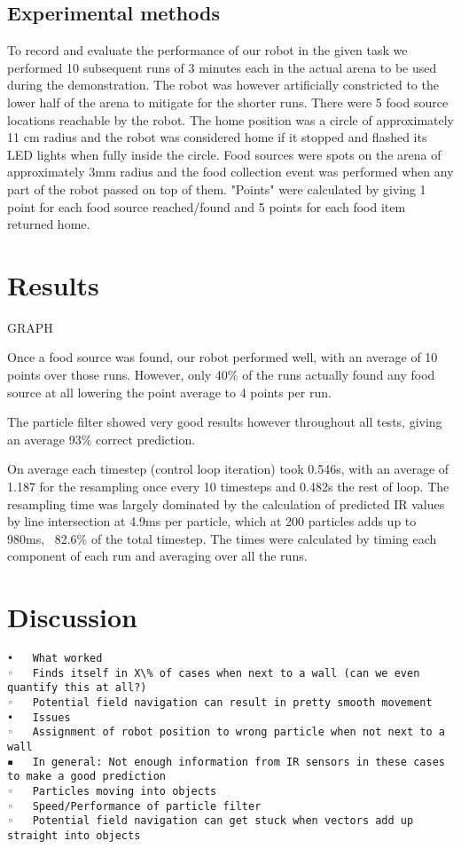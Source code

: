 \documentclass[paper=a4, fontsize=12pt]{scrartcl}	%
\numberwithin{equation}{section}		%
\numberwithin{figure}{section}			%
\numberwithin{table}{section}				%
\begin{document}
\subsection{Experimental methods}
To record and evaluate the performance of our robot in the given task we performed 10 subsequent runs of 3 minutes each in the actual arena to be used during the demonstration. The robot was however artificially constricted to the lower half of the arena to mitigate for the shorter runs. There were 5 food source locations reachable by the robot. The home position was a circle of approximately 11 cm radius and the robot was considered home if it stopped and flashed its LED lights when fully inside the circle. Food sources were spots on the arena of approximately 3mm radius and the food collection event was performed when any part of the robot passed on top of them. "Points" were calculated by giving 1 point for each food source reached/found and 5 points for each food item returned home.
\section{Results}
GRAPH

Once a food source was found, our robot performed well, with an average of 10 points over those runs. However, only 40\% of the runs actually found any food source at all lowering the point average to 4 points per run.

The particle filter showed very good results however throughout all tests, giving an average 93\% correct prediction.

On average each timestep (control loop iteration) took 0.546s, with an average of 1.187 for the resampling once every 10 timesteps and 0.482s the rest of loop. The resampling time was largely dominated by the calculation of predicted IR values by line intersection at 4.9ms per particle, which at 200 particles adds up to 980ms, ~82.6\% of the total timestep. The times were calculated by timing each component of each run and averaging over all the runs.
\section{Discussion}

\begin{verbatim}
•	What worked
◦	Finds itself in X\% of cases when next to a wall (can we even quantify this at all?)
◦	Potential field navigation can result in pretty smooth movement
•	Issues
◦	Assignment of robot position to wrong particle when not next to a wall
▪	In general: Not enough information from IR sensors in these cases to make a good prediction
◦	Particles moving into objects
◦	Speed/Performance of particle filter
◦	Potential field navigation can get stuck when vectors add up straight into objects
\end{verbatim}
\end{document}
